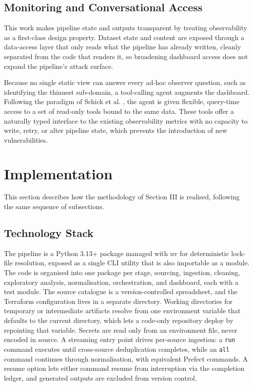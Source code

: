 \documentclass[conference]{IEEEtran}
\begin{document}
\subsection{Monitoring and Conversational Access}

This work makes pipeline state and outputs transparent by treating observability as a first-class design property. Dataset state and content are exposed through a data-access layer that only reads what the pipeline has already written, cleanly separated from the code that renders it, so broadening dashboard access does not expand the pipeline's attack surface.

Because no single static view can answer every ad-hoc observer question, such as identifying the thinnest sub-domain, a tool-calling agent augments the dashboard. Following the paradigm of Schick et al. \cite{schick2023toolformer}, the agent is given flexible, query-time access to a set of read-only tools bound to the same data. These tools offer a naturally typed interface to the existing observability metrics with no capacity to write, retry, or alter pipeline state, which prevents the introduction of new vulnerabilities.

\section{Implementation}

This section describes how the methodology of Section III is realised, following the same sequence of subsections.

\subsection{Technology Stack}

The pipeline is a Python 3.13+ package managed with uv for deterministic lock-file resolution, exposed as a single CLI utility that is also importable as a module. The code is organised into one package per stage, sourcing, ingestion, cleaning, exploratory analysis, normalisation, orchestration, and dashboard, each with a test module. The source catalogue is a version-controlled spreadsheet, and the Terraform configuration lives in a separate directory. Working directories for temporary or intermediate artifacts resolve from one environment variable that defaults to the current directory, which lets a code-only repository deploy by repointing that variable. Secrets are read only from an environment file, never encoded in source. A streaming entry point drives per-source ingestion: a \texttt{run} command executes until cross-source deduplication completes, while an \texttt{all} command continues through normalisation, with equivalent Prefect commands. A resume option lets either command resume from interruption via the completion ledger, and generated outputs are excluded from version control.
\end{document}
